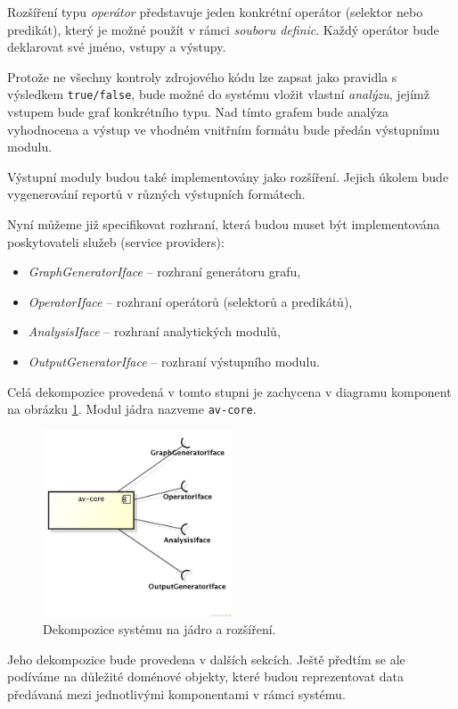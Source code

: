 Rozšíření typu \emph{operátor} představuje jeden konkrétní operátor (selektor nebo predikát), který je možné použít v rámci \emph{souboru definic}. Každý operátor bude deklarovat své jméno, vstupy a výstupy.

Protože ne všechny kontroly zdrojového kódu lze zapsat jako pravidla s výsledkem \verb+true/false+, bude možné do systému vložit vlastní \emph{analýzu}, jejímž vstupem bude graf konkrétního typu. Nad tímto grafem bude analýza vyhodnocena a výstup ve vhodném vnitřním formátu bude předán výstupnímu modulu.

Výstupní moduly budou také implementovány jako rozšíření. Jejich úkolem bude vygenerování reportů v různých výstupních formátech.

Nyní můžeme již specifikovat rozhraní, která budou muset být implementována poskytovateli služeb (service providers):

\begin{itemize}
\item \emph{GraphGeneratorIface} -- rozhraní generátoru grafu,
\item \emph{OperatorIface} -- rozhraní operátorů (selektorů a predikátů),
\item \emph{AnalysisIface} -- rozhraní analytických modulů,
\item \emph{OutputGeneratorIface} -- rozhraní výstupního modulu.
\end{itemize}

Celá dekompozice provedená v tomto stupni je zachycena v diagramu komponent na obrázku \ref{design-modules}. Modul jádra nazveme \verb+av-core+.
\begin{figure}[h!]
  \centering
  \includegraphics[width=0.5\textwidth]{./uml/archval_module_cmp.png}
  \caption{Dekompozice systému na jádro a rozšíření.\label{design-modules}}
\end{figure}
Jeho dekompozice bude provedena v dalších sekcích. Ještě předtím se ale podíváme na důležité doménové objekty, které budou reprezentovat data předávaná mezi jednotlivými komponentami v rámci systému.

